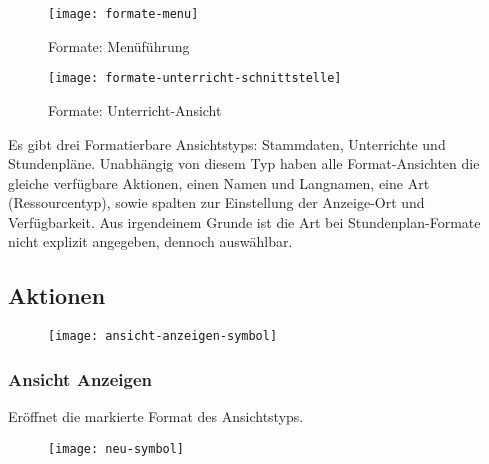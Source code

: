 \begin{figure}[h]
	\texttt{[image: formate-menu]}
	\vspace{-15pt}
	\caption{Formate: Menüführung}
	\label{fig:formate-menu}
\end{figure}

\vspace{10pt}

\begin{wrapfigure}{r}{0.4\textwidth}
	\centering
	\vspace{-14pt}
	\texttt{[image: formate-unterricht-schnittstelle]}
	\vspace{-5pt}
	\caption{Formate: Unterricht-Ansicht}
	\label{fig:formate-unterricht-schnittstelle}
	\vspace{-15pt}
\end{wrapfigure}

\noindent
Es gibt drei Formatierbare Ansichtstyps: Stammdaten, Unterrichte und Stundenpläne. Unabhängig von diesem Typ haben alle Format-Ansichten die gleiche verfügbare Aktionen, einen Namen und Langnamen, eine Art (Ressourcentyp), sowie spalten zur Einstellung der Anzeige-Ort und Verfügbarkeit. Aus irgendeinem Grunde ist die Art bei Stundenplan-Formate nicht explizit angegeben, dennoch auswählbar.\\

\subsection{Aktionen}

\begin{wrapfigure}{r}{.05\textwidth}
	\vspace{-14pt}
	\texttt{[image: ansicht-anzeigen-symbol]}
	\vspace{-40pt}
\end{wrapfigure}

\subsubsection{Ansicht Anzeigen}

\vspace{10pt}

\noindent
Eröffnet die markierte Format des Ansichtstyps.\\

\begin{wrapfigure}{r}{.05\textwidth}
	\vspace{-14pt}
	\texttt{[image: neu-symbol]}
	\vspace{-40pt}
\end{wrapfigure}

